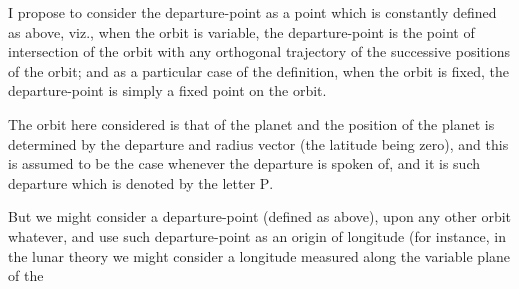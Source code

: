 \documentclass[11pt,a4paper]{article}
\theoremstyle{plain}
\begin{document}
I propose to consider the departure-point as a point which is constantly defined as above, viz., when the orbit is variable, the departure-point is the point of intersection of the orbit with any orthogonal trajectory of the successive positions of the orbit; and as a particular case of the definition, when the orbit is fixed, the departure-point is simply a fixed point on the orbit.

The orbit here considered is that of the planet and the position of the planet is determined by the departure and radius vector (the latitude being zero), and this is assumed to be the case whenever the departure is spoken of, and it is such departure which is denoted by the letter $\mathrm{P}$.

But we might consider a departure-point (defined as above), upon any other orbit whatever, and use such departure-point as an origin of longitude (for instance, in the lunar theory we might consider a longitude measured along the variable plane of the
\end{document}
